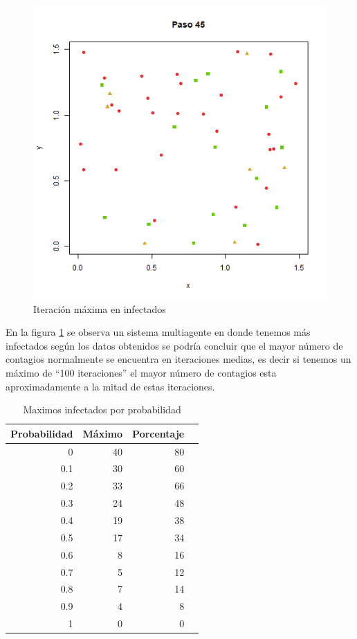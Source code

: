 \documentclass{article}
\begin{document}
\begin{figure}[H]
       \begin{center}
           \includegraphics[width=13cm]{p6_t_t.png}
\end{center}
\caption{Iteraci\'on m\'axima en infectados}
        \label{f2}
\end{figure}
 
En la figura \ref{f2} se observa un sistema multiagente en donde tenemos m\'as infectados seg\'un los datos obtenidos se podr\'ia concluir que el mayor n\'umero de contagios normalmente se encuentra en iteraciones medias, es decir si tenemos un m\'aximo de ``100 iteraciones'' el mayor n\'umero de contagios esta aproximadamente a la mitad de estas iteraciones.

\begin{table}[H]
 \centering
\caption{Maximos infectados por probabilidad}
\begin{tabular}{rrrr}
  \hline
 Probabilidad & M\'aximo & Porcentaje \\ 
  \hline
0 & 40 & 80 \\ 
 0.1 &30  & 60 \\ 
 0.2 & 33&66  \\ 
 0.3 & 24& 48 \\ 
 0.4 &19 & 38\\ 
 0.5 &  17& 34 \\ 
 0.6 & 8 &16 \\ 
 0.7 &  5&12 \\
 0.8 & 7 &14 \\
 0.9 &4  & 8 \\
 1 & 0& 0\\
   \hline
\end{tabular}
\label{t1}
\end{table}
\end{document}
